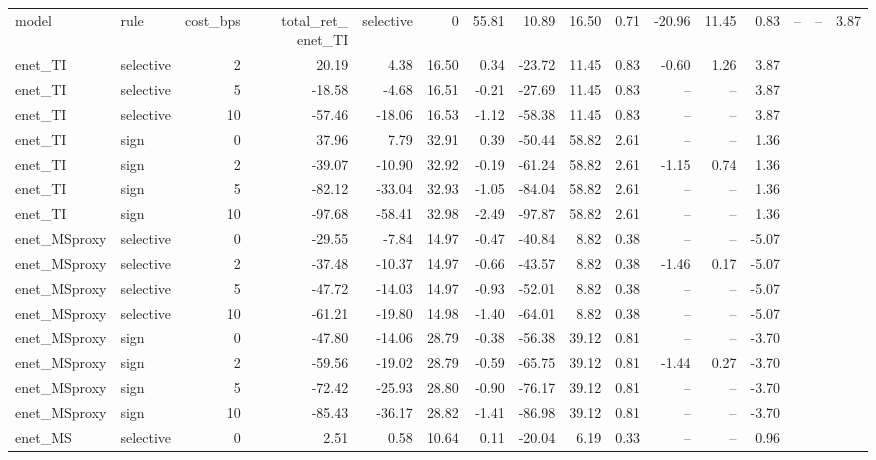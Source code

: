 \begin{tabular}{llrrrrrrrrrrr}
\toprule
model & rule & cost_bps & total_ret_%
\midrule
enet_TI & selective & 0 & 55.81 & 10.89 & 16.50 & 0.71 & -20.96 & 11.45 & 0.83 & -- & -- & 3.87 \\
enet_TI & selective & 2 & 20.19 & 4.38 & 16.50 & 0.34 & -23.72 & 11.45 & 0.83 & -0.60 & 1.26 & 3.87 \\
enet_TI & selective & 5 & -18.58 & -4.68 & 16.51 & -0.21 & -27.69 & 11.45 & 0.83 & -- & -- & 3.87 \\
enet_TI & selective & 10 & -57.46 & -18.06 & 16.53 & -1.12 & -58.38 & 11.45 & 0.83 & -- & -- & 3.87 \\
enet_TI & sign & 0 & 37.96 & 7.79 & 32.91 & 0.39 & -50.44 & 58.82 & 2.61 & -- & -- & 1.36 \\
enet_TI & sign & 2 & -39.07 & -10.90 & 32.92 & -0.19 & -61.24 & 58.82 & 2.61 & -1.15 & 0.74 & 1.36 \\
enet_TI & sign & 5 & -82.12 & -33.04 & 32.93 & -1.05 & -84.04 & 58.82 & 2.61 & -- & -- & 1.36 \\
enet_TI & sign & 10 & -97.68 & -58.41 & 32.98 & -2.49 & -97.87 & 58.82 & 2.61 & -- & -- & 1.36 \\
enet_MSproxy & selective & 0 & -29.55 & -7.84 & 14.97 & -0.47 & -40.84 & 8.82 & 0.38 & -- & -- & -5.07 \\
enet_MSproxy & selective & 2 & -37.48 & -10.37 & 14.97 & -0.66 & -43.57 & 8.82 & 0.38 & -1.46 & 0.17 & -5.07 \\
enet_MSproxy & selective & 5 & -47.72 & -14.03 & 14.97 & -0.93 & -52.01 & 8.82 & 0.38 & -- & -- & -5.07 \\
enet_MSproxy & selective & 10 & -61.21 & -19.80 & 14.98 & -1.40 & -64.01 & 8.82 & 0.38 & -- & -- & -5.07 \\
enet_MSproxy & sign & 0 & -47.80 & -14.06 & 28.79 & -0.38 & -56.38 & 39.12 & 0.81 & -- & -- & -3.70 \\
enet_MSproxy & sign & 2 & -59.56 & -19.02 & 28.79 & -0.59 & -65.75 & 39.12 & 0.81 & -1.44 & 0.27 & -3.70 \\
enet_MSproxy & sign & 5 & -72.42 & -25.93 & 28.80 & -0.90 & -76.17 & 39.12 & 0.81 & -- & -- & -3.70 \\
enet_MSproxy & sign & 10 & -85.43 & -36.17 & 28.82 & -1.41 & -86.98 & 39.12 & 0.81 & -- & -- & -3.70 \\
enet_MS & selective & 0 & 2.51 & 0.58 & 10.64 & 0.11 & -20.04 & 6.19 & 0.33 & -- & -- & 0.96 \\

\end{tabular}
